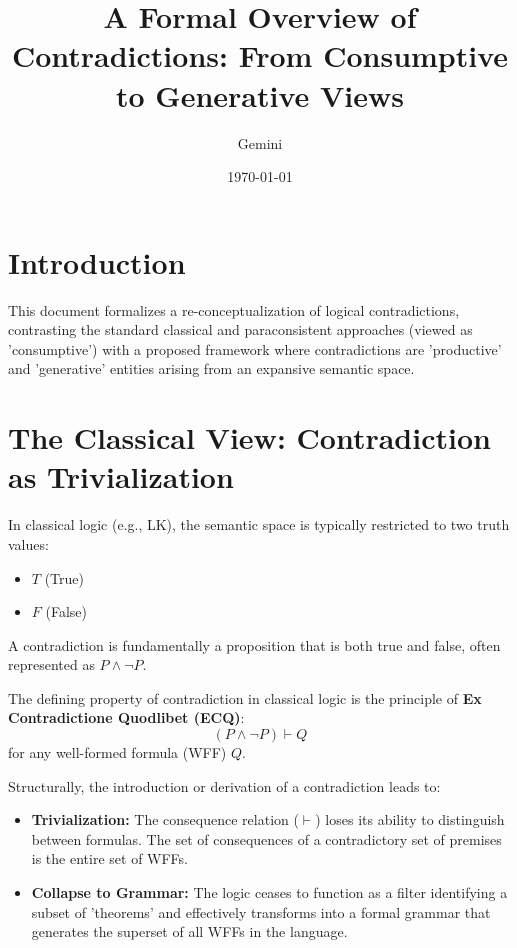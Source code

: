 \documentclass{article}
\title{A Formal Overview of Contradictions: From Consumptive to Generative Views}
\author{Gemini}
\date{\today}
\begin{document}
	\maketitle
	
	\section{Introduction}
	
	This document formalizes a re-conceptualization of logical contradictions, contrasting the standard classical and paraconsistent approaches (viewed as 'consumptive') with a proposed framework where contradictions are 'productive' and 'generative' entities arising from an expansive semantic space.
	
	\section{The Classical View: Contradiction as Trivialization}
	
	In classical logic (e.g., LK), the semantic space is typically restricted to two truth values:
	\begin{itemize}
		\item $T$ (True)
		\item $F$ (False)
	\end{itemize}
	A contradiction is fundamentally a proposition that is both true and false, often represented as $P \land \neg P$.
	
	The defining property of contradiction in classical logic is the principle of \textbf{Ex Contradictione Quodlibet (ECQ)}:
	$$ (P \land \neg P) \vdash Q $$
	for any well-formed formula (WFF) $Q$.
	
	Structurally, the introduction or derivation of a contradiction leads to:
	\begin{itemize}
		\item \textbf{Trivialization:} The consequence relation ($\vdash$) loses its ability to distinguish between formulas. The set of consequences of a contradictory set of premises is the entire set of WFFs.
		\item \textbf{Collapse to Grammar:} The logic ceases to function as a filter identifying a subset of 'theorems' and effectively transforms into a formal grammar that generates the superset of all WFFs in the language.
	\end{itemize}
	
\end{document}
